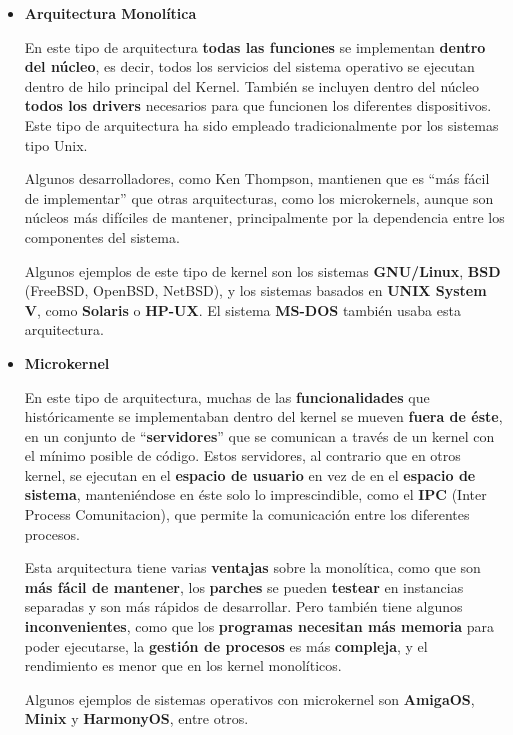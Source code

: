 \begin{itemize}
    \item \textbf{Arquitectura Monolítica}

    En este tipo de arquitectura \textbf{todas las funciones} se implementan \textbf{dentro del núcleo}, es decir, todos los servicios del sistema operativo se ejecutan dentro de hilo principal del Kernel. También se incluyen dentro del núcleo \textbf{todos los drivers} necesarios para que funcionen los diferentes dispositivos. Este tipo de arquitectura ha sido empleado tradicionalmente por los sistemas tipo Unix. \cite{wiki04}

    Algunos desarrolladores, como Ken Thompson, mantienen que es ``más fácil de implementar'' que otras arquitecturas, como los microkernels, aunque son núcleos más difíciles de mantener, principalmente por la dependencia entre los componentes del sistema. \cite{wiki03}

    Algunos ejemplos de este tipo de kernel son los sistemas \textbf{GNU/Linux}, \textbf{BSD} (FreeBSD, OpenBSD, NetBSD), y los sistemas basados en \textbf{UNIX System V}, como \textbf{Solaris} o \textbf{HP-UX}. El sistema \textbf{MS-DOS} también usaba esta arquitectura.

    \item \textbf{Microkernel}

    En este tipo de arquitectura, muchas de las \textbf{funcionalidades} que históricamente se implementaban dentro del kernel se mueven \textbf{fuera de éste}, en un conjunto de ``\textbf{servidores}'' que se comunican a través de un kernel con el mínimo posible de código. Estos servidores, al contrario que en otros kernel, se ejecutan en el \textbf{espacio de usuario} en vez de en el \textbf{espacio de sistema}, manteniéndose en éste solo lo imprescindible, como el \textbf{IPC} (Inter Process Comunitacion), que permite la comunicación entre los diferentes procesos. \cite{wiki01}

    Esta arquitectura tiene varias \textbf{ventajas} sobre la monolítica, como que son \textbf{más fácil de mantener}, los \textbf{parches} se pueden \textbf{testear} en instancias separadas y son más rápidos de desarrollar. Pero también tiene algunos \textbf{inconvenientes}, como que los \textbf{programas necesitan más memoria} para poder ejecutarse, la \textbf{gestión de procesos} es más \textbf{compleja}, y el rendimiento es menor que en los kernel monolíticos. \cite{wiki01}

    Algunos ejemplos de sistemas operativos con microkernel son \textbf{AmigaOS}, \textbf{Minix} y 	\textbf{HarmonyOS}, entre otros.


\end{itemize}
